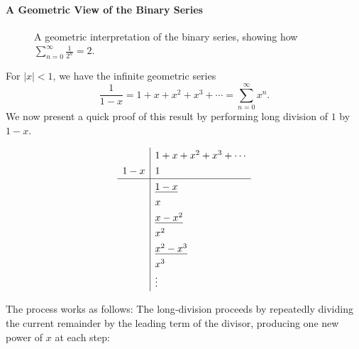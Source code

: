 \documentclass{article}
\begin{document}
\paragraph{A Geometric View of the Binary Series}
\begin{figure}[ht]
  \centering
\caption{A geometric interpretation of the binary series, showing how 
\(\sum_{n=0}^{\infty} \tfrac{1}{2^n} = 2\).}
\end{figure}
For \(|x| < 1\), we have the infinite geometric series
\[
\frac{1}{1-x} = 1 + x + x^2 + x^3 + \cdots = \sum_{n=0}^{\infty} x^n.
\]
We now present a quick proof of this result by performing long division of \(1\) by \(1-x\).

\[
\renewcommand{\arraystretch}{1.3}
\begin{array}{r|l}
 & 1 + x + x^2 + x^3 + \cdots \\ %
1 - x & 1  \\ %
\hline
 & \underline{1 - x} \\
 & x \\
 & \underline{x - x^2} \\
 & x^2 \\
 & \underline{x^2 - x^3} \\
 & x^3 \\
 & \vdots
\end{array}
\]


The process works as follows:
The long‑division proceeds by repeatedly dividing the current remainder by the leading term of the divisor, producing one new power of \(x\) at each step:
\end{document}
